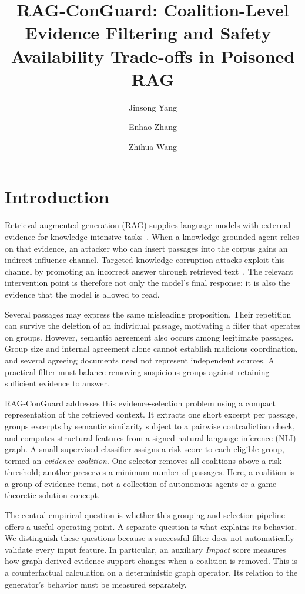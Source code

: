 \documentclass[sigconf]{aamas}
\title[RAG-ConGuard: Coalition-Level Evidence Filtering]{RAG-ConGuard: Coalition-Level Evidence Filtering and Safety--Availability Trade-offs in Poisoned RAG}
\author{Jinsong Yang}
\affiliation{%
  \institution{Zhengzhou University}
  \city{Zhengzhou}
  \state{Henan}
  \country{China}}
\author{Enhao Zhang}
\affiliation{%
  \institution{Zhengzhou University}
  \city{Zhengzhou}
  \state{Henan}
  \country{China}}
\author{Zhihua Wang}
\affiliation{%
  \institution{Zhengzhou University}
  \city{Zhengzhou}
  \state{Henan}
  \country{China}}
\begin{document}
\maketitle

\section{Introduction}
Retrieval-augmented generation (RAG) supplies language models with external evidence for knowledge-intensive tasks~\cite{rag}. When a knowledge-grounded agent relies on that evidence, an attacker who can insert passages into the corpus gains an indirect influence channel. Targeted knowledge-corruption attacks exploit this channel by promoting an incorrect answer through retrieved text~\cite{poisonedrag}. The relevant intervention point is therefore not only the model's final response: it is also the evidence that the model is allowed to read.

Several passages may express the same misleading proposition. Their repetition can survive the deletion of an individual passage, motivating a filter that operates on groups. However, semantic agreement also occurs among legitimate passages. Group size and internal agreement alone cannot establish malicious coordination, and several agreeing documents need not represent independent sources. A practical filter must balance removing suspicious groups against retaining sufficient evidence to answer.

RAG-ConGuard addresses this evidence-selection problem using a compact representation of the retrieved context. It extracts one short excerpt per passage, groups excerpts by semantic similarity subject to a pairwise contradiction check, and computes structural features from a signed natural-language-inference (NLI) graph. A small supervised classifier assigns a risk score to each eligible group, termed an \emph{evidence coalition}. One selector removes all coalitions above a risk threshold; another preserves a minimum number of passages. Here, a coalition is a group of evidence items, not a collection of autonomous agents or a game-theoretic solution concept.

The central empirical question is whether this grouping and selection pipeline offers a useful operating point. A separate question is what explains its behavior. We distinguish these questions because a successful filter does not automatically validate every input feature. In particular, an auxiliary \emph{Impact} score measures how graph-derived evidence support changes when a coalition is removed. This is a counterfactual calculation on a deterministic graph operator. Its relation to the generator's behavior must be measured separately.
\end{document}
